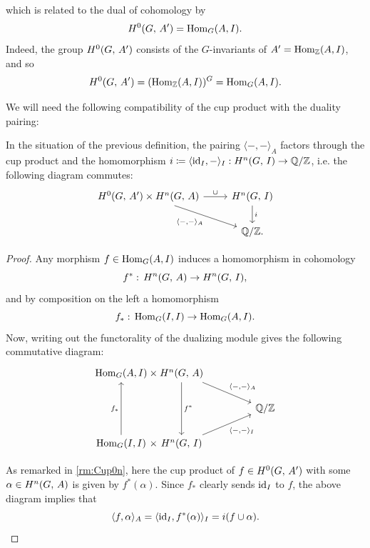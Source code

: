 \documentclass[a4paper, oneside]{memoir}
\begin{document}
which is related to the dual of cohomology by
\[
    H^{0}( G, \, A^{\prime} ) = \operatorname{Hom}_G(A,I).
\]
Indeed, the group \(H^{0}( G, \, A^{\prime}  )\) consists of the \(G\)-invariants of \(A^{\prime} = \operatorname{Hom}_{\mathbb{Z}}(A,I)\), and so
\[
    H^{0}( G, \, A^{\prime} ) = (\operatorname{Hom}_{\mathbb{Z}}(A,I))^G = \operatorname{Hom}_G(A,I).
\]

We will need the following compatibility of the cup product with the duality pairing:

\begin{lemma}\label{lm:CompatCupDual}
    In the situation of the previous definition, the pairing \(\langle-,- \rangle_A\) factors through the cup product and the homomorphism \(i\coloneqq \langle \operatorname{id}_I,-\rangle_I: H^{n}( G, \, I )\to \mathbb{Q}/\mathbb{Z}\), i.e. the following diagram commutes:
    \[
        \begin{tikzcd}
            {\H{0}{G}{A^\prime}  \times \H{n}{G}{A}} \ar[swap, rd, "\langle - {,} - \rangle_A "] \ar[r, "\cup"] & \H{n}{G}{I} \ar[d, "i"] \\
            & \Q/\Z.
        \end{tikzcd}
    \]
\end{lemma}

\begin{proof}
    Any morphism \(f\in\operatorname{Hom}_G(A,I)\) induces a homomorphism in cohomology
    \[
        f^*:\, H^{n}( G, \, A )\to H^{n}( G, \, I ),
    \]
    and by composition on the left a homomorphism
    \[
        f_*:\, \operatorname{Hom}_G(I,I)\to\operatorname{Hom}_G(A,I)
        .\]
    Now, writing out the functorality of the dualizing module gives the following commutative diagram:
    \[
        \tikzset{
            symbol/.style={
                    draw=none,
                    every to/.append style={
                            edge node={node [sloped, allow upside down, auto=false]{$#1$}}}
                }
        }
        \begin{tikzcd}
            \Hom_G(A,I) \arrow[r,symbol=\times] &[-2em] \ar[dd, "f^*"] \H{n}{G}{A} \ar[rd, "\langle - {,} - \rangle_A "] &[2em] \\
            && \Q/\Z \\
            \Hom_G(I,I)  \arrow[r,symbol=\times] \ar[uu, "f_*"] & \H{n}{G}{I}  \ar[swap, ru, "\langle - {,} - \rangle_I "]
        \end{tikzcd}
    \]

    As remarked in \ref{rm:Cup0n}, here the cup product of \(f\in H^{0}( G, \, A^{\prime} )\) with some \(\alpha\in H^{n}( G, \, A )\) is given by
    \( f^*(\alpha) \). Since \(f_*\) clearly sends \(\operatorname{id}_I\) to \(f\), the above diagram implies that
    \[
        \langle f, \alpha \rangle_A = \langle \operatorname{id}_I, f^*(\alpha)\rangle_I=i(f\cup\alpha).
    \]
\end{proof}
\end{document}
